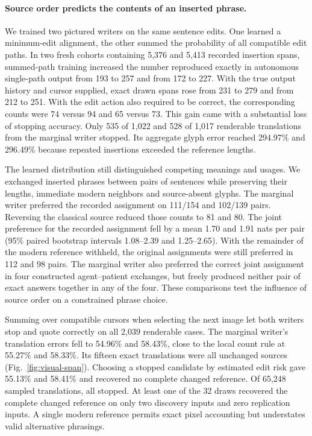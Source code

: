 \documentclass[12pt,a4paper]{article}
\providecommand{\DIFadd}[1]{{\protect\color{blue} \sf #1}} %
\begin{document}
\paragraph{\DIFadd{Source order predicts the contents of an inserted phrase.}}
\DIFadd{We trained two pictured writers on the same sentence edits. One learned a minimum-edit alignment, the other summed the probability of all compatible edit paths. In two fresh cohorts containing 5,376 and 5,413 recorded insertion spans, summed-path training increased the number reproduced exactly in autonomous single-path output from 193 to 257 and from 172 to 227. With the true output history and cursor supplied, exact drawn spans rose from 231 to 279 and from 212 to 251. With the edit action also required to be correct, the corresponding counts were 74 versus 94 and 65 versus 73. This gain came with a substantial loss of stopping accuracy. Only 535 of 1,022 and 528 of 1,017 renderable translations from the marginal writer stopped. Its aggregate glyph error reached 294.97\% and 296.49\% because repeated insertions exceeded the reference lengths.
}

\DIFadd{The learned distribution still distinguished competing meanings and usages. We exchanged inserted phrases between pairs of sentences while preserving their lengths, immediate modern neighbors and source-absent glyphs. The marginal writer preferred the recorded assignment on 111/154 and 102/139 pairs. Reversing the classical source reduced those counts to 81 and 80. The joint preference for the recorded assignment fell by a mean 1.70 and 1.91 nats per pair (95\% paired bootstrap intervals 1.08--2.39 and 1.25--2.65). With the remainder of the modern reference withheld, the original assignments were still preferred in 112 and 98 pairs. The marginal writer also preferred the correct joint assignment in four constructed agent--patient exchanges, but freely produced neither pair of exact answers together in any of the four. These comparisons test the influence of source order on a constrained phrase choice.
}

\DIFadd{Summing over compatible cursors when selecting the next image let both writers stop and quote correctly on all 2,039 renderable cases. The marginal writer's translation errors fell to 54.96\% and 58.43\%, close to the local count rule at 55.27\% and 58.33\%. Its fifteen exact translations were all unchanged sources (Fig.~\ref{fig:visual-span}). Choosing a stopped candidate by estimated edit risk gave 55.13\% and 58.41\% and recovered no complete changed reference. Of 65,248 sampled translations, all stopped. At least one of the 32 draws recovered the complete changed reference on only two discovery inputs and zero replication inputs. A single modern reference permits exact pixel accounting but understates valid alternative phrasings.
}
\end{document}
